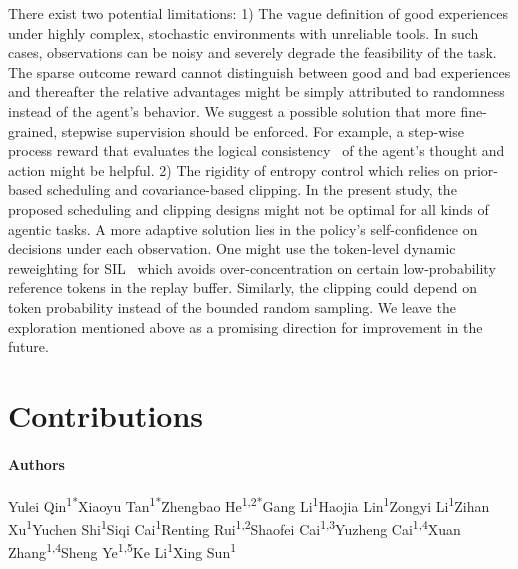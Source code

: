 \documentclass[]{youtu} %
\begin{document}
There exist two potential limitations:
1) The vague definition of good experiences under highly complex, stochastic environments with unreliable tools. In such cases, observations can be noisy and severely degrade the feasibility of the task. The sparse outcome reward cannot distinguish between good and bad experiences and thereafter the relative advantages might be simply attributed to randomness instead of the agent's behavior. We suggest a possible solution that more fine-grained, stepwise supervision should be enforced.
For example,
a step-wise process reward that evaluates the logical consistency~\cite{zhang2025rlvmr} of the agent's thought and action might be helpful.
2) The rigidity of entropy control which relies on prior-based scheduling and covariance-based clipping. In the present study, 
the proposed scheduling and clipping designs might not be optimal for all kinds of agentic tasks. A more adaptive solution lies in the policy's self-confidence on decisions under each observation.
One might use the token-level dynamic reweighting for SIL~\cite{wu2025generalization} which avoids over-concentration on certain low-probability reference tokens in the replay buffer. Similarly, the clipping could depend on token probability instead of the bounded random sampling.
We leave the exploration mentioned above as a promising direction for improvement in the future.




\clearpage
\newpage
\section*{Contributions}
\paragraph{Authors}
Yulei Qin\textsuperscript{\rm 1*}\quad Xiaoyu Tan\textsuperscript{\rm 1*}\quad Zhengbao He\textsuperscript{\rm 1,2*}\quad Gang Li\textsuperscript{\rm 1}\quad Haojia Lin\textsuperscript{\rm 1}\quad Zongyi Li\textsuperscript{\rm 1}\quad Zihan Xu\textsuperscript{\rm 1}\quad Yuchen Shi\textsuperscript{\rm 1}\quad Siqi Cai\textsuperscript{\rm 1}\quad Renting Rui\textsuperscript{\rm 1,2}\quad Shaofei Cai\textsuperscript{\rm 1,3}\quad Yuzheng Cai\textsuperscript{\rm 1,4}\quad Xuan Zhang\textsuperscript{\rm 1,4}\quad Sheng Ye\textsuperscript{\rm 1,5}\quad Ke Li\textsuperscript{\rm 1}\quad Xing Sun\textsuperscript{\rm 1}
\end{document}
